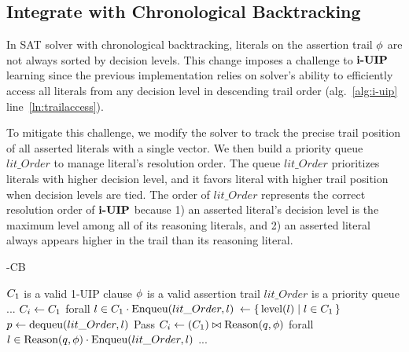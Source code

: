 \subsection{Integrate with Chronological Backtracking}
In SAT solver with chronological backtracking, literals on the assertion trail $\phi$ are not always sorted by decision levels. This change imposes a challenge to $\textbf{i-UIP}$ learning since the previous implementation relies on solver's ability to efficiently access all literals from any decision level in descending trail order (alg.~\ref{alg:i-uip} line~\ref{ln:trailaccess}). 

To mitigate this challenge, we modify the solver to track the precise trail position of all asserted literals with a single vector. We then build a priority queue $lit\_Order$ to manage literal's resolution order. The queue $lit\_Order$  prioritizes literals with higher decision level, and it favors literal with higher trail position when decision levels are tied. The order of $lit\_Order$  represents the correct resolution order of $\textbf{i-UIP}$ because 1) an asserted literal's decision level is the maximum level among all of its reasoning literals, and 2) an asserted literal always appears higher in the trail than its reasoning literal.  

\begin{algorithm}[t]
\caption{\IUIP-CB}\label{alg:i-uip-CB}
\begin{algorithmic}[1]
\Require  $C_{1}$ is a valid 1-UIP clause
\Require  $\phi$ is a valid assertion trail
\Require  $lit\_Order$ is a priority queue
    \State ...
    \State $C_{i} \gets C_{1} $ 
    \State forall $l \in C_{1} \cdot \text{Enqueu}(lit\_Order, l)$  \label{ln:enqueue}
    \State {} $\gets \{\,\text{level}(l)\mid l \in C_{1}\,\}$
     \label{ln:pop}
        \State $p \gets \text{dequeu}(lit\_Order, l) $ \label{ln:dequeue}
         \label{ln:resolvable}
          \State Pass
        \Else 
            \State  $C_{i} \gets (C_{1} ) \bowtie \text{Reason}(q, \phi)$
            \State   forall $l \in \text{Reason}(q, \phi) \cdot \text{Enqueu}(lit\_Order, l)$ \label{ln:reequeue}
        \EndIf
    \EndWhile
\State ...
\EndProcedure
\end{algorithmic}
\end{algorithm}

